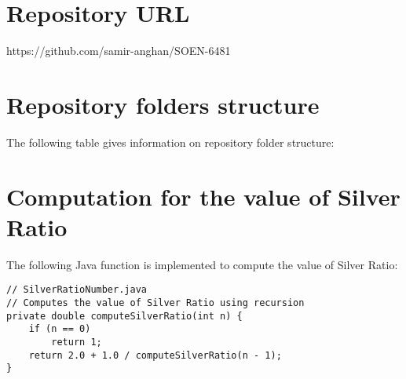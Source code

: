 \section{Repository URL}
https://github.com/samir-anghan/SOEN-6481

\section{Repository folders structure}
The following table gives information on repository folder structure:
\begin{table}[!ht]
\centering
{}
\caption{Github Repository Folder Structure}
\label{tab:my-table}
\end{table}

\section{Computation for the value of Silver Ratio}

The following Java function is implemented to compute the value of Silver Ratio: \\

\begin{lstlisting}
// SilverRatioNumber.java
// Computes the value of Silver Ratio using recursion
private double computeSilverRatio(int n) {
	if (n == 0)
		return 1;
	return 2.0 + 1.0 / computeSilverRatio(n - 1);
}
\end{lstlisting}